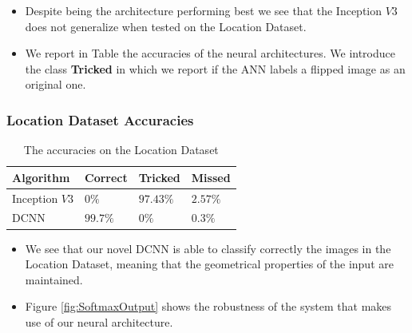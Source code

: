 \documentclass[a0, portrait]{IWIposter}
\begin{document}
\begin{multicols}{3}
\begin{itemize}
	\item Despite being the architecture performing best we see that the Inception $V3$ does not generalize when tested on the Location Dataset.
	\item We report in Table the accuracies of the neural architectures. We introduce the class \textbf{Tricked} in which we report if the ANN labels a flipped image as an original one.
\end{itemize}

\centering
\subsubsection*{Location Dataset Accuracies}

\begin{table}
\centering
\caption{The accuracies on the Location Dataset}
\begin{tabular}{>{\rowmac}l|>{\rowmac}l|>{\rowmac}l|>{\rowmac}l<{\clearrow}}
\textbf{Algorithm}   & \textbf{Correct} & \textbf{Tricked} & \textbf{Missed}  \\ \hline
       Inception $V3$         & $0\%$              & $97.43\%$            & $2.57\%$     \\
       DCNN                   & $99.7\%$              & $0\%$           & $0.3\%$          \\
\end{tabular}\label{tab:tab2}
\end{table}

\begin{itemize}
	\item We see that our novel DCNN is able to classify correctly the images in the Location Dataset, meaning that the geometrical properties of the input are maintained. 
	\item Figure \ref{fig:SoftmaxOutput} shows the robustness of the system that makes use of our neural architecture. 
\end{itemize}



\end{multicols}
\end{document}
